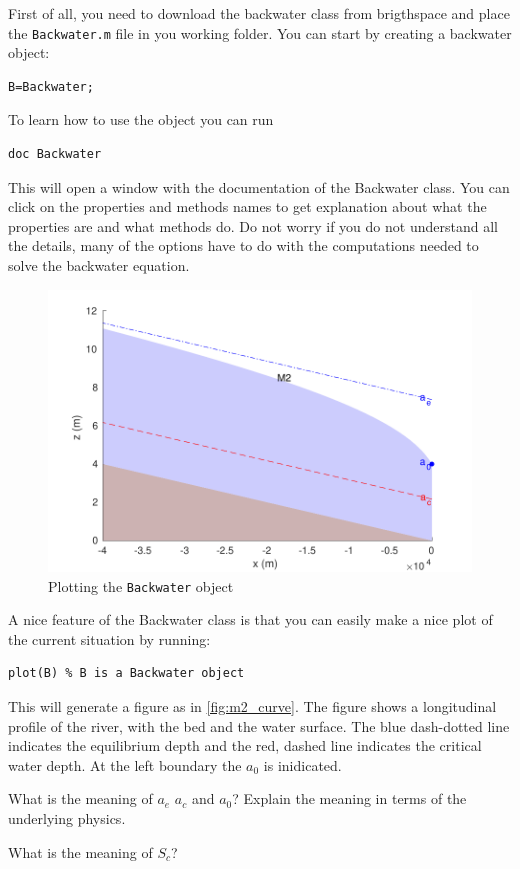 \documentclass[a4paper]{article}
\begin{document}
First of all, you need to download the backwater class from brigthspace and place the \lstinline=Backwater.m= file in you working folder. You can start by creating a backwater object:
\begin{lstlisting}
B=Backwater;
\end{lstlisting}
To learn how to use the object you can run
\begin{lstlisting}
doc Backwater
\end{lstlisting}
This will open a window with the documentation of the Backwater class. You can click on the properties and methods names to get explanation about what the properties are and what methods do. Do not worry if you do not understand all the details, many of the options have to do with the computations needed to solve the backwater equation.
\begin{figure}[h]
  \centering
  \includegraphics{m2_curve.pdf}
  \caption{Plotting the \lstinline{Backwater} object}
  \label{fig:m2_curve}
\end{figure}

A nice feature of the Backwater class is that you can easily make a nice plot of the current situation by running:
\begin{lstlisting}
plot(B) % B is a Backwater object
\end{lstlisting}
This will generate a figure as in \autoref{fig:m2_curve}. The figure shows a longitudinal profile of the river, with the bed and the water surface. The blue dash-dotted line indicates the equilibrium depth and the red, dashed line indicates the critical water depth. At the left boundary the $a_0$ is inidicated.
\begin{exercise}
  What is the meaning of $a_e$ $a_c$ and $a_0$? Explain the meaning in terms of the underlying physics.
\end{exercise}
\begin{exercise}
  What is the meaning of $S_c$?
\end{exercise}
\end{document}
